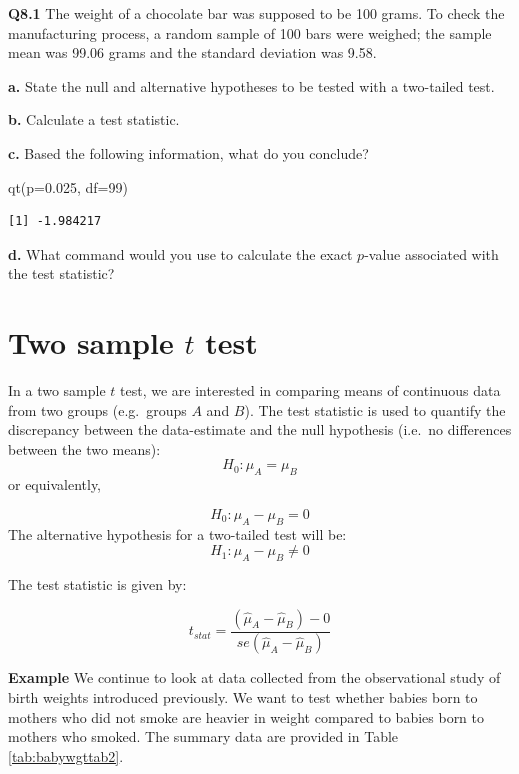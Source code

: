 \documentclass[
  oneside]{krantz}
\newenvironment{Shaded}{\begin{snugshade}}{\end{snugshade}}
\newcommand{\AttributeTok}[1]{\textcolor[rgb]{0.77,0.63,0.00}{#1}}
\newcommand{\DecValTok}[1]{\textcolor[rgb]{0.00,0.00,0.81}{#1}}
\newcommand{\FloatTok}[1]{\textcolor[rgb]{0.00,0.00,0.81}{#1}}
\newcommand{\FunctionTok}[1]{\textcolor[rgb]{0.00,0.00,0.00}{#1}}
\newcommand{\NormalTok}[1]{#1}
\begin{document}
\textbf{Q8.1} The weight of a chocolate bar was supposed to be 100 grams. To check the manufacturing process, a random sample of 100 bars were weighed; the sample mean was 99.06 grams and the standard deviation was 9.58.

\textbf{a.} State the null and alternative hypotheses to be tested with a two-tailed test.

\textbf{b.} Calculate a test statistic.

\textbf{c.} Based the following information, what do you conclude?

\begin{Shaded}
\begin{Highlighting}[]
\FunctionTok{qt}\NormalTok{(}\AttributeTok{p=}\FloatTok{0.025}\NormalTok{, }\AttributeTok{df=}\DecValTok{99}\NormalTok{)}
\end{Highlighting}
\end{Shaded}

\begin{verbatim}
[1] -1.984217
\end{verbatim}

\textbf{d.} What command would you use to calculate the exact \(p\)-value associated with the test statistic?

\hypertarget{two-sample-t-test}{%
\section{\texorpdfstring{Two sample \(t\) test}{Two sample t test}}\label{two-sample-t-test}}

In a two sample \(t\) test, we are interested in comparing means of continuous data from two groups (e.g.~groups \(A\) and \(B\)). The test statistic is used to quantify the discrepancy between the data-estimate and the null hypothesis (i.e.~no differences between the two means):
\[H_0 : \mu_A = \mu_B\]
or equivalently,

\[H_0 : \mu_A - \mu_B = 0\]
The alternative hypothesis for a two-tailed test will be:
\[H_1 : \mu_A - \mu_B \ne 0\]

The test statistic is given by:

\[t_{stat} = \frac{(\hat{\mu}_A - \hat{\mu}_B) - 0}{se(\hat{\mu}_A - \hat{\mu}_B)}\]

\textbf{Example} We continue to look at data collected from the observational study of birth weights introduced previously. We want to test whether babies born to mothers who did not smoke are heavier in weight compared to babies born to mothers who smoked. The summary data are provided in Table \ref{tab:babywgttab2}.
\end{document}

